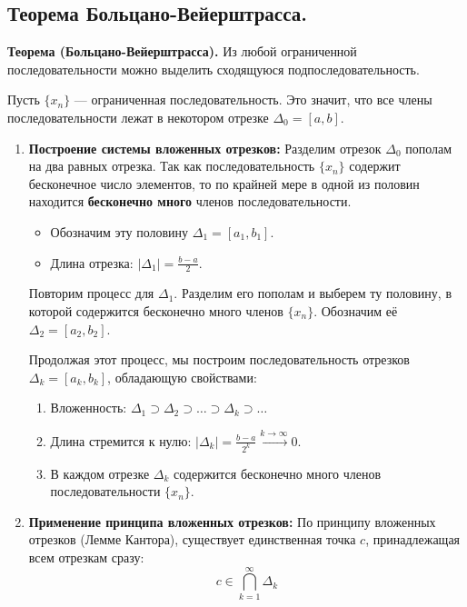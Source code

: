 \subsection{Теорема Больцано-Вейерштрасса.}

\textbf{Теорема (Больцано-Вейерштрасса).}
Из любой ограниченной последовательности можно выделить сходящуюся подпоследовательность.

\begin{tcolorbox}[title=Доказательство (через вложенные отрезки)]
	Пусть $\{x_n\}$ — ограниченная последовательность.
	Это значит, что все члены последовательности лежат в некотором отрезке $\Delta_0 = [a, b]$.
	
	\begin{enumerate}
		\item \textbf{Построение системы вложенных отрезков:}
		Разделим отрезок $\Delta_0$ пополам на два равных отрезка.
		Так как последовательность $\{x_n\}$ содержит бесконечное число элементов, то по крайней мере в одной из половин находится \textbf{бесконечно много} членов последовательности.
		\begin{itemize}
			\item Обозначим эту половину $\Delta_1 = [a_1, b_1]$.
			\item Длина отрезка: $|\Delta_1| = \frac{b-a}{2}$.
		\end{itemize}
		
		Повторим процесс для $\Delta_1$. Разделим его пополам и выберем ту половину, в которой содержится бесконечно много членов $\{x_n\}$. Обозначим её $\Delta_2 = [a_2, b_2]$.
		
		Продолжая этот процесс, мы построим последовательность отрезков $\Delta_k = [a_k, b_k]$, обладающую свойствами:
		\begin{enumerate}
			\item Вложенность: $\Delta_1 \supset \Delta_2 \supset \dots \supset \Delta_k \supset \dots$
			\item Длина стремится к нулю: $|\Delta_k| = \frac{b-a}{2^k} \xrightarrow{k\to\infty} 0$.
			\item В каждом отрезке $\Delta_k$ содержится бесконечно много членов последовательности $\{x_n\}$.
		\end{enumerate}

		\item \textbf{Применение принципа вложенных отрезков:}
		По принципу вложенных отрезков (Лемме Кантора), существует единственная точка $c$, принадлежащая всем отрезкам сразу:
		$$ c \in \bigcap_{k=1}^{\infty} \Delta_k $$


\end{enumerate}
\end{tcolorbox}
